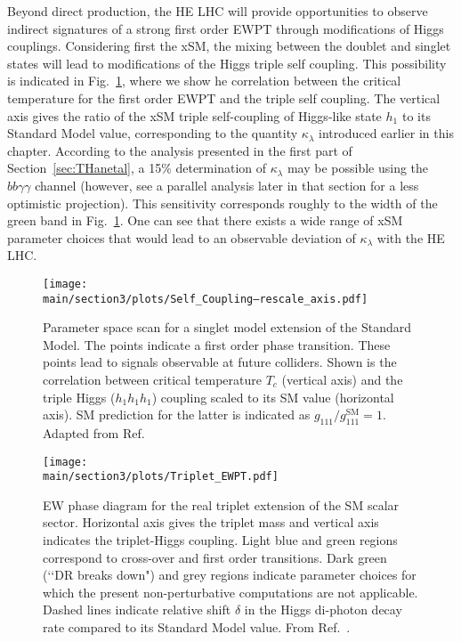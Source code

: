 Beyond direct production, the HE LHC will provide opportunities to observe indirect signatures of a strong first order EWPT through modifications of Higgs couplings. Considering first the xSM, the mixing between the doublet and singlet states will lead to modifications of the Higgs triple self coupling. This possibility is indicated in Fig.~\ref{fig:ewpt_self}, where we show he correlation between the critical temperature for the first order EWPT and the triple self coupling. The vertical axis gives the ratio of the xSM triple self-coupling of Higgs-like state $h_1$ to its Standard Model value, corresponding to the quantity $\kappa_\lambda$  introduced earlier in this chapter.  According to the analysis presented in the first part of Section~\ref{sec:THanetal}, a 15\% determination of $\kappa_\lambda$ may be possible using the $bb\gamma\gamma$ channel (however, see a parallel analysis later in that section for a less optimistic projection). This sensitivity corresponds roughly to the width of the green band in Fig.~\ref{fig:ewpt_self}. One can see that there exists a wide range of xSM parameter choices that would lead to an observable deviation of $\kappa_\lambda$ with the HE LHC.

\begin{figure}[hbtp]
  \begin{center}
    \texttt{[image: \\main/section3/plots/Self\_Coupling--rescale\_axis.pdf]}
    \caption{
    Parameter space scan for a singlet model extension of the Standard Model. The points indicate a first order phase transition. These points lead to signals observable at future colliders. Shown is the correlation between critical temperature $T_c$ (vertical axis) and the triple Higgs ($h_1 h_1 h_1$) coupling scaled to its SM value (horizontal axis). SM prediction for the latter is indicated as $g_{111}/g_{111}^\mathrm{SM}=1$. Adapted from Ref.~\cite{Profumo:2014opa}   
        }
    \label{fig:ewpt_self}
  \end{center}
\end{figure}

\begin{figure}[hbtp]
  \begin{center}
  \texttt{[image: \\main/section3/plots/Triplet\_EWPT.pdf]}
    \caption{
    EW phase diagram for the real triplet extension of the SM scalar sector. Horizontal axis gives the triplet mass and vertical axis indicates the triplet-Higgs coupling. Light blue and green regions correspond to cross-over and first order transitions. Dark green (\lq\lq DR breaks down") and grey regions indicate parameter choices for which the present non-perturbative computations are not applicable. Dashed lines indicate relative shift $\delta$ in the Higgs di-photon decay rate compared to its Standard Model value. From Ref.~\cite{Niemi:2018asa}.    
        }
    \label{fig:ewpt_triplet}
  \end{center}
\end{figure}

